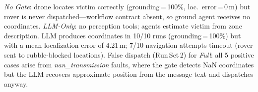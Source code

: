 \begin{table}[h]
\smallskip
\noindent\footnotesize
\textit{No Gate}: drone locates victim correctly (grounding\,=\,100\%, loc.\ error\,=\,0\,m) but rover
is never dispatched---workflow contract absent, so ground agent receives no coordinates.
\textit{LLM-Only}: no perception tools; agents estimate victim from zone description.
LLM produces coordinates in 10/10 runs (grounding\,=\,100\%) but with a mean localization error of 4.21\,m;
7/10 navigation attempts timeout (rover sent to rubble-blocked locations).
False dispatch (Run\,Set\,2) for \textit{Full}: all 5 positive cases arise from
\textit{nan\_transmission} faults, where the gate detects NaN coordinates but the LLM
recovers approximate position from the message text and dispatches anyway.
\end{table}
